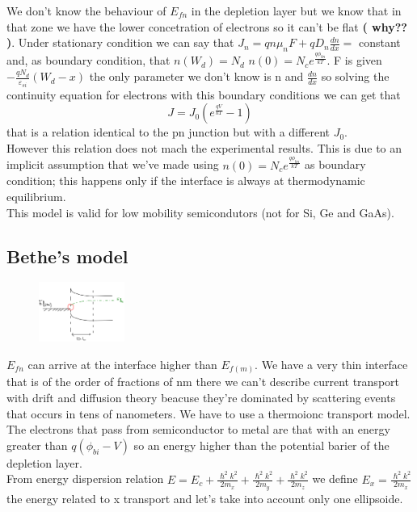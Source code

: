 We don't know the behaviour of $E_{fn}$ in the depletion layer but we know that in that zone we have the lower concetration of electrons so it can't be flat {\bf( why?? )}. Under stationary condition we can say that $ J_n=qn\mu_nF+qD_n \frac{dn}{dx}=$ constant and, as boundary condition, that $n(W_d)=N_d$ $n(0)=N_ce^{\frac{q\phi_{bn}}{kT}}$. F is given $-\frac{qN_d}{\varepsilon_{si}}(W_d-x)$ the only parameter we don't know is n and $\frac{dn}{dx}$ so solving the continuity equation for electrons with this boundary conditions we can get that
\begin{equation}
J=J_0(e^{\frac{qV}{kT}}-1)
\end{equation}
that is a relation identical to the pn junction but with a different $J_0$.\\
However this relation does not mach the experimental results. This is due to an implicit assumption that we've made using $n(0)=N_ce^{\frac{q\phi_{bn}}{kT}}$ as boundary condition; this happens only if the interface is always at thermodynamic equilibrium.\\
This model is valid for low mobility semicondutors (not for Si, Ge and GaAs).\\
\subsection{Bethe's model}
\begin{figure}
\includegraphics[width=0.25\textwidth]{msne.png}
\end{figure}

$E_{fn}$ can arrive at the interface higher than $E_{f(m)}$. We have a very thin interface that is of the order of fractions of nm there we can't describe current transport with drift and diffusion theory beacuse they're dominated by scattering events that occurs in tens of nanometers. We have to use a thermoionc transport model.\\
The electrons that pass from semiconductor to metal are that with an energy greater than $q(\phi_{bi}-V)$ so an energy higher than the potential barier of the depletion layer.\\
From energy dispersion relation $E=E_c+\frac{\hslash^2k^2}{2m_x}+\frac{\hslash^2k^2}{2m_y}+\frac{\hslash^2k^2}{2m_z}$ we define $E_x=\frac{\hslash^2k^2}{2m_x}$ the energy related to x transport and let's take into account only one ellipsoide.\\

